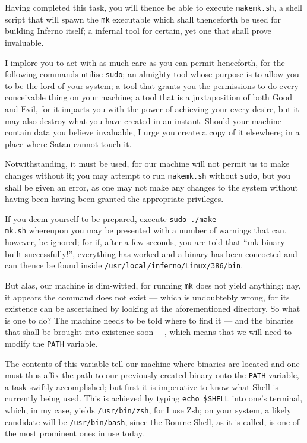 \documentclass[a5paper,twoside,12pt]{report}
\begin{document}
Having completed this task, you will thence be able to execute \texttt{makemk.sh}, a shell script that will spawn the \texttt{mk} executable which shall thenceforth be used for building Inferno itself; a infernal tool for certain, yet one that shall prove invaluable.

I implore you to act with as much care as you can permit henceforth, for the following commands utilise \texttt{sudo}; an almighty tool whose purpose is to allow you to be the lord of your system; a tool that grants you the permissions to do every conceivable thing on your machine; a tool that is a juxtaposition of both Good and Evil, for it imparts you with the power of achieving your every desire, but it may also destroy what you have created in an instant. Should your machine contain data you believe invaluable, I urge you create a copy of it elsewhere; in a place where Satan cannot touch it.

Notwithstanding, it must be used, for our machine will not permit us to make changes without it; you may attempt to run \texttt{makemk.sh} without \texttt{sudo}, but you shall be given an error, as one may not make any changes to the system without having been having been granted the appropriate privileges.

If you deem yourself to be prepared, execute \texttt{sudo ./make\\mk.sh} whereupon you may be presented with a number of warnings that can, however, be ignored; for if, after a few seconds, you are told that ``mk binary built successfully!'', everything has worked and a binary has been concocted and can thence be found inside \texttt{/usr/local/inferno/Linux/386/bin}.

But alas, our machine is dim-witted, for running \texttt{mk} does not yield anything; nay, it appears the command does not exist — which is undoubtebly wrong, for its existence can be ascertained by looking at the aforementioned directory. So what is one to do? The machine needs to be told where to find it — and the binaries that shall be brought into existence soon —, which means that we will need to modify the \texttt{PATH} variable.

The contents of this variable tell our machine where binaries are located and one must thus affix the path to our previously created binary onto the \texttt{PATH} variable, a task swiftly accomplished; but first it is imperative to know what Shell is currently being used. This is achieved by typing \texttt{echo \$SHELL} into one's terminal, which, in my case, yields \texttt{/usr/bin/zsh}, for I use Zsh; on your system, a likely candidate will be \texttt{/usr/bin/bash}, since the Bourne Shell, as it is called, is one of the most prominent ones in use today.
\end{document}
